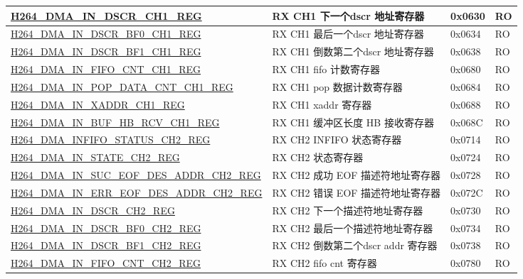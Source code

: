 \begin{longtable}{ | p{7.5cm} | p{5.7cm} | p{1.2cm} | p{1cm} | }
    \hyperref[regdesc:H264DMAINDSCRCH1REG]{H264\_DMA\_IN\_DSCR\_CH1\_REG} & RX CH1 下一个dscr 地址寄存器 & 0x0630 & RO \\ \hline
    \hyperref[regdesc:H264DMAINDSCRBF0CH1REG]{H264\_DMA\_IN\_DSCR\_BF0\_CH1\_REG} & RX CH1 最后一个dscr 地址寄存器 & 0x0634 & RO \\ \hline
    \hyperref[regdesc:H264DMAINDSCRBF1CH1REG]{H264\_DMA\_IN\_DSCR\_BF1\_CH1\_REG} & RX CH1 倒数第二个dscr 地址寄存器 & 0x0638 & RO \\ \hline
    \hyperref[regdesc:H264DMAINFIFOCNTCH1REG]{H264\_DMA\_IN\_FIFO\_CNT\_CH1\_REG} & RX CH1 fifo 计数寄存器 & 0x0680 & RO \\ \hline
    \hyperref[regdesc:H264DMAINPOPDATACNTCH1REG]{H264\_DMA\_IN\_POP\_DATA\_CNT\_CH1\_REG} & RX CH1 pop 数据计数寄存器 & 0x0684 & RO \\ \hline
    \hyperref[regdesc:H264DMAINXADDRCH1REG]{H264\_DMA\_IN\_XADDR\_CH1\_REG} & RX CH1 xaddr 寄存器 & 0x0688 & RO \\ \hline
    \hyperref[regdesc:H264DMAINBUFHBRCVCH1REG]{H264\_DMA\_IN\_BUF\_HB\_RCV\_CH1\_REG} & RX CH1  缓冲区长度 HB 接收寄存器 & 0x068C & RO \\ \hline
    \hyperref[regdesc:H264DMAINFIFOSTATUSCH2REG]{H264\_DMA\_INFIFO\_STATUS\_CH2\_REG} & RX CH2 INFIFO 状态寄存器 & 0x0714 & RO \\ \hline
    \hyperref[regdesc:H264DMAINSTATECH2REG]{H264\_DMA\_IN\_STATE\_CH2\_REG} & RX CH2 状态寄存器 & 0x0724 & RO \\ \hline
    \hyperref[regdesc:H264DMAINSUCEOFDESADDRCH2REG]{H264\_DMA\_IN\_SUC\_EOF\_DES\_ADDR\_CH2\_REG} & RX CH2 成功 EOF 描述符地址寄存器 & 0x0728 & RO \\ \hline
    \hyperref[regdesc:H264DMAINERREOFDESADDRCH2REG]{H264\_DMA\_IN\_ERR\_EOF\_DES\_ADDR\_CH2\_REG} & RX CH2 错误 EOF 描述符地址寄存器 & 0x072C & RO \\ \hline
    \hyperref[regdesc:H264DMAINDSCRCH2REG]{H264\_DMA\_IN\_DSCR\_CH2\_REG} & RX CH2 下一个描述符地址寄存器 & 0x0730 & RO \\ \hline
    \hyperref[regdesc:H264DMAINDSCRBF0CH2REG]{H264\_DMA\_IN\_DSCR\_BF0\_CH2\_REG} & RX CH2 最后一个描述符地址寄存器 & 0x0734 & RO \\ \hline
    \hyperref[regdesc:H264DMAINDSCRBF1CH2REG]{H264\_DMA\_IN\_DSCR\_BF1\_CH2\_REG} & RX CH2 倒数第二个dscr addr 寄存器 & 0x0738 & RO \\ \hline
    \hyperref[regdesc:H264DMAINFIFOCNTCH2REG]{H264\_DMA\_IN\_FIFO\_CNT\_CH2\_REG} & RX CH2 fifo cnt 寄存器 & 0x0780 & RO \\ \hline

\end{longtable}
